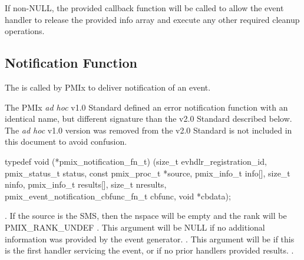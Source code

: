 If non-NULL, the provided callback function will be called to allow the event handler to release the provided info array and execute any other required cleanup operations.


\subsection{Notification Function}

\summary

The  is called by \ac{PMIx} to deliver notification of an event.

\adviceuserstart
The \ac{PMIx} \textit{ad hoc} v1.0 Standard defined an error notification function with an identical name, but different signature than the v2.0 Standard described below. The \textit{ad hoc} v1.0 version was removed from the v2.0 Standard is not included in this document to avoid confusion.
\adviceuserend


\cspecificstart
\begin{codepar}
typedef void (*pmix_notification_fn_t)
    (size_t evhdlr_registration_id,
     pmix_status_t status,
     const pmix_proc_t *source,
     pmix_info_t info[], size_t ninfo,
     pmix_info_t results[], size_t nresults,
     pmix_event_notification_cbfunc_fn_t cbfunc,
     void *cbdata);
\end{codepar}
\cspecificend

\begin{arglist}
. If the source is the \ac{SMS}, then the nspace will be empty and the rank will be PMIX_RANK_UNDEF
. This argument will be NULL if no additional information was provided by the event generator.
. This argument will be  if this is the first handler servicing the event, or if no prior handlers provided results.
.
\end{arglist}


